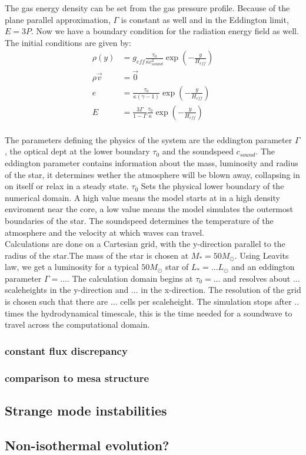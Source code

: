 The gas energy density can be set from the gas pressure profile. Because of the plane parallel approximation, $\Gamma$ is constant as well and in the Eddington limit, $E=3P$. Now we have a boundary condition for the radiation energy field as well. The initial conditions are given by:
\begin{align}
\rho(y) &= g_{eff} \frac{\tau_0}{\kappa c_{sound}^2} \exp \left( -\frac{y}{H_{eff}} \right) \\
\rho \vec{v} &= \vec{0} \\
e &= \frac{\tau_0}{\kappa (\gamma - 1)} \exp \left( -\frac{y}{H_{eff}} \right) \\
E &= \frac{3 \Gamma}{1-\Gamma} \frac{\tau_0}{\kappa} \exp \left( -\frac{y}{H_{eff}} \right) \\
\end{align}

The parameters defining the physics of the system are the eddington parameter $\Gamma$, the optical dept at the lower boundary $\tau_0$ and the soundspeed $c_{sound}$. The eddington parameter contains information about the mass, luminosity and radius of the star, it determines wether the atmosphere will be blown away, collapsing in on itself or relax in a steady state. $\tau_0$ Sets the physical lower boundary of the numerical domain. A high value means the model starts at in a high density enviroment near the core, a low value means the model simulates the outermost boundaries of the star. The soundspeed determines the temperature of the atmosphere and the velocity at which waves can travel. \\

Calculations are done on a Cartesian grid, with the y-direction parallel to the radius of the star.The mass of the star is chosen at $M_* = 50 M_\odot$. Using Leavits law, we get a luminosity for a typical $50M_\odot$ star of $L_* = ... L_\odot$ and an eddington parameter $\Gamma = ...$. The calculation domain begins at $\tau_0 = ...$ and resolves about $...$ scaleheights in the y-direction and $...$ in the x-direction. The resolution of the grid is chosen such that there are $...$ cells per scaleheight. The simulation stops after $..$ times the hydrodynamical timescale, this is the time needed for a soundwave to travel across the computational domain. 

\subsubsection{constant flux discrepancy}
\subsubsection{comparison to mesa structure}

\subsection{Strange mode instabilities}

\subsection{Non-isothermal evolution?}
